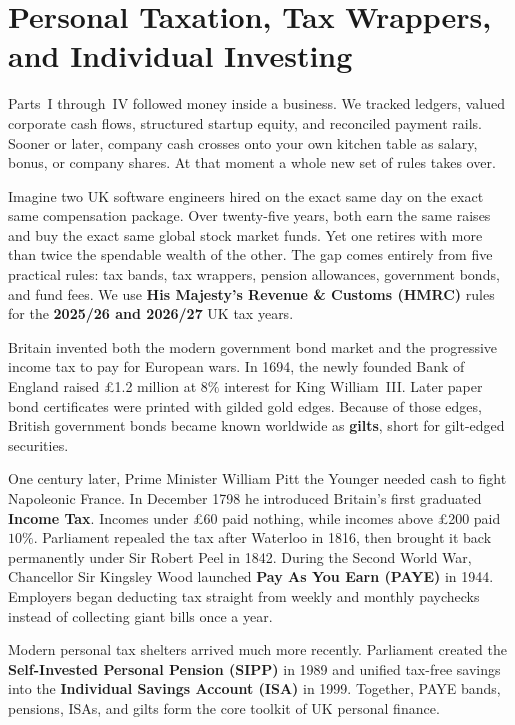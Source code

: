 \chapter{Personal Taxation, Tax Wrappers, and Individual Investing}
\label{ch:uk-personal-finance}
\chapterline

Parts~I through~IV followed money inside a business. We tracked ledgers, valued corporate cash flows, structured startup equity, and reconciled payment rails. Sooner or later, company cash crosses onto your own kitchen table as salary, bonus, or company shares. At that moment a whole new set of rules takes over.

Imagine two UK software engineers hired on the exact same day on the exact same compensation package. Over twenty-five years, both earn the same raises and buy the exact same global stock market funds. Yet one retires with more than twice the spendable wealth of the other. The gap comes entirely from five practical rules: tax bands, tax wrappers, pension allowances, government bonds, and fund fees. We use \textbf{His Majesty's Revenue \& Customs (HMRC)} rules for the \textbf{2025/26 and 2026/27} UK tax years.

\begin{historybox}
Britain invented both the modern government bond market and the progressive income tax to pay for European wars. In 1694, the newly founded Bank of England raised \pounds 1.2 million at $8\%$ interest for King William~III. Later paper bond certificates were printed with gilded gold edges. Because of those edges, British government bonds became known worldwide as \textbf{gilts}, short for gilt-edged securities.

One century later, Prime Minister William Pitt the Younger needed cash to fight Napoleonic France. In December 1798 he introduced Britain's first graduated \textbf{Income Tax}. Incomes under \pounds 60 paid nothing, while incomes above \pounds 200 paid $10\%$. Parliament repealed the tax after Waterloo in 1816, then brought it back permanently under Sir Robert Peel in 1842. During the Second World War, Chancellor Sir Kingsley Wood launched \textbf{Pay As You Earn (PAYE)} in 1944. Employers began deducting tax straight from weekly and monthly paychecks instead of collecting giant bills once a year.

Modern personal tax shelters arrived much more recently. Parliament created the \textbf{Self-Invested Personal Pension (SIPP)} in 1989 and unified tax-free savings into the \textbf{Individual Savings Account (ISA)} in 1999. Together, PAYE bands, pensions, ISAs, and gilts form the core toolkit of UK personal finance.
\end{historybox}

